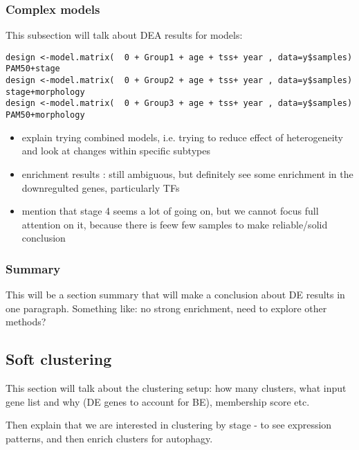         
        \subsubsection{Complex models}
        This subsection will talk about DEA results for models:
        
 \texttt{design <-model.matrix(~ 0 + Group1 + age + tss+ year , data=y\$samples) PAM50+stage\\
        design <-model.matrix(~ 0 + Group2 + age + tss+ year , data=y\$samples) stage+morphology\\
        design <-model.matrix(~ 0 + Group3 + age + tss+ year , data=y\$samples) PAM50+morphology\\
        }
        \begin{itemize}
            \item explain trying combined models, i.e. trying to reduce effect of heterogeneity and look at changes within specific subtypes
            \item enrichment results : still ambiguous, but definitely see some enrichment in the downregulted genes, particularly TFs
            \item mention that stage 4 seems a lot of going on, but we cannot focus full attention on it, because there is feew few samples to make reliable/solid conclusion
                    
        \end{itemize}
            
        \subsubsection{Summary}
        
        This will be a section summary that will make a conclusion about DE results in one paragraph. Something like: no strong enrichment, need to explore other methods?
        

    \subsection{Soft clustering}
    
    
        This section will talk about the clustering setup: how many clusters, what input gene list and why (DE genes to account for BE), membership score etc.
        
        Then explain that we are interested in clustering by stage - to see expression patterns, and then enrich clusters for autophagy.
        
